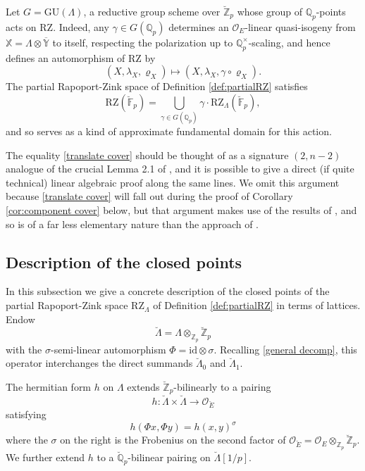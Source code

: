 \documentclass[11pt]{alggeom}
\newcommand{\Q}{\mathbb Q}
\newcommand{\Z}{\mathbb Z}
\newcommand{\F}{\mathbb F}
\newcommand{\co}{\mathcal O}
\begin{document}
\begin{remark}\label{rem:domain}
  Let  $G=\mathrm{GU}(\Lambda)$, a reductive group scheme  over $\breve{\Z}_p$ whose  group of $\Q_p$-points  acts on $\mathrm{RZ}$.
Indeed, any  $ \gamma \in G(\Q_p)$  determines an $\co_E$-linear quasi-isogeny from  $\mathbb{X}=  \Lambda  \otimes \overline{\mathbb{Y}} $ to itself, respecting the polarization up to $\Q_p^\times$-scaling, and hence defines an automorphism of $\mathrm{RZ}$ by
\[
 (X,\lambda_X,\varrho_X)  \mapsto (X,\lambda_X, \gamma \circ \varrho_X).
\]
The partial Rapoport-Zink space of Definition \ref{def:partialRZ} satisfies
\begin{equation}\label{translate cover}
\mathrm{RZ}(\breve{\F}_p) =
 \bigcup_{\gamma \in G(\Q_p)} \gamma\cdot \mathrm{RZ}_\Lambda(\breve{\F}_p)  ,
\end{equation}
and so  serves as a kind of approximate fundamental domain for this action.

The equality \eqref{translate cover}  should be thought of as a signature $(2,n-2)$ analogue of the crucial Lemma 2.1 of \cite{Vollaard}, and it is possible to give a direct (if quite technical) linear algebraic proof along the same lines.  
We omit this argument because  \eqref{translate cover} will fall out during the proof of Corollary \ref{cor:component cover} below, but that argument makes use of the  results of \cite{XZ}, and so is of a far less elementary nature than the approach of \cite{Vollaard}. 
\end{remark}




 
 \subsection{Description of the closed points}
 \label{ss:partial points}
 

In this subsection we give a concrete description of the closed points of the partial Rapoport-Zink space $\mathrm{RZ}_\Lambda$ of Definition \ref{def:partialRZ}  in terms of lattices.
Endow 
\[
\breve{\Lambda} = \Lambda \otimes_{\Z_p} \breve{\Z}_p
\]
 with the $\sigma$-semi-linear automorphism $\Phi = \mathrm{id} \otimes \sigma$.   Recalling \eqref{general decomp}, this operator interchanges the direct summands 
$ \breve{\Lambda}_0$ and $\breve{\Lambda}_1$.

The hermitian form $h$ on $\Lambda$ extends $\breve{\Z}_p$-bilinearly to a pairing
\[
h : \breve{\Lambda} \times \breve{\Lambda} \to \co_{\breve{E}}
\]
satisfying 
\begin{equation}\label{hPhi}
h (\Phi x,\Phi y) = h ( x, y) ^\sigma 
\end{equation}
 where the $\sigma$ on the right  is the Frobenius on the second factor of $\co_{\breve{E} }=  \co_E\otimes_{\Z_p} \breve{\Z}_p$.
We further extend $h$ to a  $\breve{\Q}_p$-bilinear pairing on $\breve{\Lambda}[1/p]$.
\end{document}
